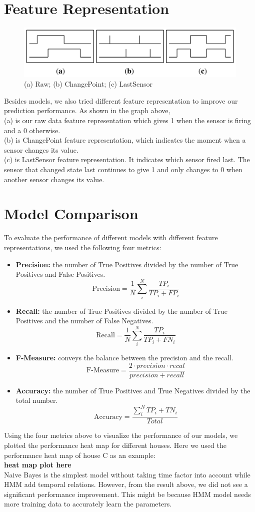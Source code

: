 \documentclass[10pt,letter]{article}
\numberwithin{equation}{section} %
\numberwithin{figure}{section} %
\numberwithin{table}{section} %
\begin{document}
\section{Feature Representation}
\begin{figure}[h]
\centering
\includegraphics[width=14cm]{feature}
\caption{ (a) Raw; (b) ChangePoint; (c) LastSensor}
\end{figure}
Besides models, we also tried different feature representation to improve our prediction performance. 
As shown in the graph above, 
\\(a) is our raw data feature representation which gives 1 when the sensor is firing and a 0 otherwise.  
\\(b) is ChangePoint feature representation, which indicates the moment when a sensor changes its value. 
\\(c) is LastSensor feature representation. It indicates which sensor fired last. The sensor that changed state last continues to give 1 and only changes to 0 when another sensor changes its value.

\section{Model Comparison}
To evaluate the performance of different models with different feature representations, we used the following four metrics:
\begin{itemize}
\item \textbf{Precision:} the number of True Positives divided by the number of True Positives and False Positives.
$$\text{Precision} = \frac{1}{N}\sum^N_i \frac{TP_i}{TP_i+FP_i} $$
\item \textbf{Recall:} the number of True Positives divided by the number of True Positives and the number of False Negatives.
$$\text{Recall} = \frac{1}{N}\sum^N_i\frac{TP_i}{TP_i + FN_i} $$
\item \textbf{F-Measure:} conveys the balance between the precision and the recall.
$$\text{F-Measure} = \frac{2 \cdot precision \cdot recal}{precision+recall} $$
\item \textbf{Accuracy:} the number of True Positives and True Negatives divided by the total number.
$$\text{Accuracy} = \frac{\sum^N_i TP_i + TN_i}{Total}$$
\end{itemize}
Using the four metrics above to visualize the performance of our models, we plotted the performance heat map for different houses. Here we used the performance heat map of house C as an example:\\
\textbf{heat map plot here}
\\
Naive Bayes is the simplest model without taking time factor into account while HMM add temporal relations. However, from the result above, we did not see a significant performance improvement. This might be because HMM model needs more training data to accurately learn the parameters. 
\end{document}
